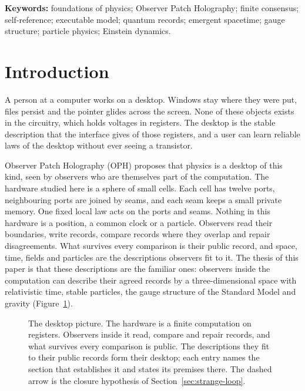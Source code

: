 \documentclass[11pt]{article}
\theoremstyle{definition}
\theoremstyle{remark}
\begin{document}
\vspace{0.5em}
\noindent\textbf{Keywords:} foundations of physics; Observer Patch Holography;
finite consensus; self-reference; executable model; quantum records;
emergent spacetime; gauge structure; particle physics; Einstein dynamics.

\section{Introduction}
\label{sec:intro}

A person at a computer works on a desktop. Windows stay where they were
put, files persist and the pointer glides across the screen. None of
these objects exists in the circuitry, which holds voltages in
registers. The desktop is the stable description that the interface
gives of those registers, and a user can learn reliable laws of the
desktop without ever seeing a transistor.

Observer Patch Holography (OPH) proposes that physics is a desktop of
this kind, seen by observers who are themselves part of the
computation. The hardware studied here is a sphere of small cells. Each
cell has twelve ports, neighbouring ports are joined by seams, and each
seam keeps a small private memory. One fixed local law acts on the
ports and seams. Nothing in this hardware is a position, a common clock
or a particle. Observers read their boundaries, write records, compare
records where they overlap and repair disagreements. What survives every
comparison is their public record, and space, time, fields and
particles are the descriptions observers fit to it. The thesis of this
paper is that these descriptions are the familiar ones: observers inside
the computation can describe their agreed records by a
three-dimensional space with relativistic time, stable particles, the
gauge structure of the Standard Model and gravity
(Figure~\ref{fig:desktop}).

\begin{figure}[!htb]
\centering

\caption{The desktop picture. The hardware is a finite computation on
registers. Observers inside it read, compare and repair records, and
what survives every comparison is public. The descriptions they fit to
their public records form their desktop; each entry names the section
that establishes it and states its premises there. The dashed arrow is
the closure hypothesis of Section~\ref{sec:strange-loop}.}
\label{fig:desktop}
\end{figure}
\end{document}
